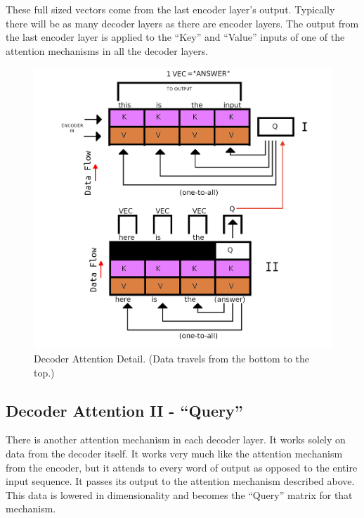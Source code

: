 These full sized vectors come from the last encoder layer's output. Typically there will be as many decoder layers as there are encoder layers. The output from the last encoder layer is applied to the ``Key'' and ``Value'' inputs of one of the attention mechanisms in all the decoder layers.
\begin{figure}[H]
	\begin{center}
		
		
		\includegraphics[scale=0.75]{diagram-graph-decoder-flow-c}
	\end{center}
	\caption[Decoder Attention Detail]{Decoder Attention Detail. (Data travels from the bottom to the top.)}
	
	
\end{figure}


\subsection{Decoder Attention II - ``Query''}
There is another attention mechanism in each decoder layer. It works solely on data from the decoder itself. It works very much like the attention mechanism from the encoder, but it attends to every word of output as opposed to the entire input sequence. It passes its output to the attention mechanism described above. This data is lowered in dimensionality and becomes the ``Query'' matrix for that mechanism. 

